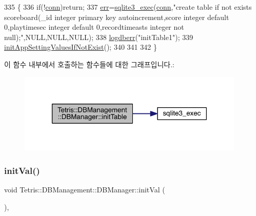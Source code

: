 \begin{DoxyCode}
335                             \{
336                 \textcolor{keywordflow}{if}(!\hyperlink{class_tetris_1_1_d_b_management_1_1_d_b_manager_acc2c19420c2b1b1b2c1e724b3a8ec4b7}{conn})\textcolor{keywordflow}{return};
337                 \hyperlink{class_tetris_1_1_d_b_management_1_1_d_b_manager_a9ea8d963f1a9b8117fa5e92b54eda114}{err}=\hyperlink{sqlite3_8h_a97487ec8150e0bcc8fa392ab8f0e24db}{sqlite3\_exec}(\hyperlink{class_tetris_1_1_d_b_management_1_1_d_b_manager_acc2c19420c2b1b1b2c1e724b3a8ec4b7}{conn},\textcolor{stringliteral}{"create table if not exists scoreboard(\_id integer
       primary key autoincrement,score integer default 0,playtimesec integer default 0,recordtimeasts integer not
       null);"},NULL,NULL,NULL);
338                 \hyperlink{class_tetris_1_1_d_b_management_1_1_d_b_manager_a6b723e555cef747b7402661eb960bd78}{logdberr}(\textcolor{stringliteral}{"initTable1"});
339                 \hyperlink{class_tetris_1_1_d_b_management_1_1_d_b_manager_a08f9bdc18cc015a7746e47c37eba613c}{initAppSettingValuesIfNotExist}();
340                 
341                 
342             \}
\end{DoxyCode}
이 함수 내부에서 호출하는 함수들에 대한 그래프입니다.\+:
\nopagebreak
\begin{figure}[H]
\begin{center}
\leavevmode
\includegraphics[width=306pt]{da/d79/class_tetris_1_1_d_b_management_1_1_d_b_manager_a07a391f97339bacd983f2598dd7a3ade_cgraph}
\end{center}
\end{figure}
\mbox{\label{class_tetris_1_1_d_b_management_1_1_d_b_manager_afa17031e7f2bf8c61073bc79442bacfd}} 
\subsubsection{\texorpdfstring{init\+Val()}{initVal()}}
{\footnotesize\ttfamily void Tetris\+::\+D\+B\+Management\+::\+D\+B\+Manager\+::init\+Val (\begin{DoxyParamCaption}{ }\end{DoxyParamCaption})\hspace{0.3cm}{\ttfamily [inline]}, {\ttfamily [private]}}



